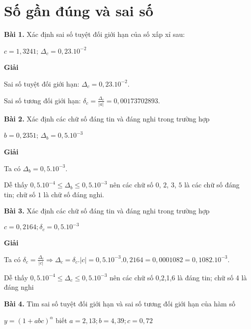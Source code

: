 \chapter{Số gần đúng và sai số}

\textbf{\color{blue}Bài 1.} Xác định sai số tuyệt đối giới hạn của số xấp xỉ sau:\par
{\centering $c=1,3241$; $\Delta_c=0,23.10^{-2}$\par}

\textbf{Giải}\par
Sai số tuyệt đối giới hạn: $\Delta_c=0,23.10^{-2}$.\par
Sai số tương đối giới hạn: $\delta_c=\frac{\Delta_c}{\lvert a\rvert}=0,00173702893$.\par

\textbf{\color{blue}Bài 2.} Xác định các chữ số đáng tin và đáng nghi trong trường hợp\par
{\centering $b=0,2351$; $\Delta_b=0,5.10^{-3}$\par}

\textbf{Giải}\par
Ta có $\Delta_b=0,5.10^{-3}$.\par
Dễ thấy $0,5.10^{-4}\leqslant \Delta_b \leqslant 0,5.10^{-3}$ nên các chữ số $0$, $2$, $3$, $5$ là các chữ số đáng tin; chữ số $1$ là chữ số đáng nghi.

\textbf{\color{blue}Bài 3.} Xác định các chữ số đáng tin và đáng nghi trong trường hợp\par
{\centering $c=0,2164;\delta_c=0,5.10^{-3}$\par}

\textbf{Giải}\par
Ta có $\delta_c=\frac{\Delta_c}{|c|}\Rightarrow \Delta_c=\delta_c.|c|=0,5.10^{-3}.0,2164=0,0001082=0,1082.10^{-3}$.\par
Dễ thấy $0,5.10^{-4}\leqslant\Delta_c \leqslant 0,5.10^{-3}$ nên các chữ số 0,2,1,6 là đáng tin; chữ số 4 là đáng nghi\par

\textbf{\color{blue}Bài 4.} Tìm sai số tuyệt đối giới hạn và sai số tương đối giới hạn của hàm số\par
{\centering $y=(1+abc)^{\alpha}$ biết $a=2,13;b=4,39;c=0,72$\par}

